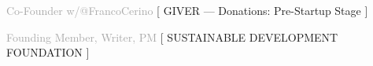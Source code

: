



% 
    {\textcolor{darkgray}%
    {%
    Co-Founder w/@FrancoCerino
    }}%
	{[ 
    {G\scriptsize IVER}
	---
	Donations:
	Pre-Startup 
	Stage%
	]}%
	{
	}
% 

    {\textcolor{darkgray}%
    {%
    Founding Member, Writer, %
    PM}}%
	{[ %
	{S\scriptsize USTAINABLE}
	{D\scriptsize EVELOPMENT}
	{F\scriptsize OUNDATION}
	]}%
	{
	}
% 

